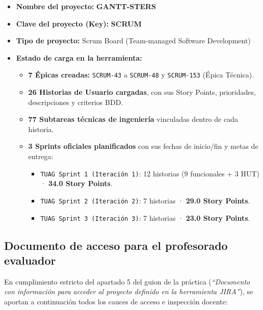 \documentclass[11pt,a4paper]{article}
\newcommand{\hl}[1]{\textcolor{gblue}{\textbf{#1}}}
\begin{document}
\begin{itemize}
\item \textbf{Nombre del proyecto:} \hl{GANTT-STERS}
\item \textbf{Clave del proyecto (Key):} \hl{SCRUM}
\item \textbf{Tipo de proyecto:} Scrum Board (Team-managed Software Development)
\item \textbf{Estado de carga en la herramienta:}
\begin{itemize}
\item \textbf{7 Épicas creadas:} \texttt{SCRUM-43} a \texttt{SCRUM-48} y \texttt{SCRUM-153} (Épica Técnica).
\item \textbf{26 Historias de Usuario cargadas}, con sus Story Points, prioridades, descripciones y criterios BDD.
\item \textbf{77 Subtareas técnicas de ingeniería} vinculadas dentro de cada historia.
\item \textbf{3 Sprints oficiales planificados} con sus fechas de inicio/fin y metas de entrega:
\begin{itemize}
\item \texttt{TUAG Sprint 1 (Iteración 1)}: 12 historias (9 funcionales + 3 HUT) · \textbf{34.0 Story Points}.
\item \texttt{TUAG Sprint 2 (Iteración 2)}: 7 historias · \textbf{29.0 Story Points}.
\item \texttt{TUAG Sprint 3 (Iteración 3)}: 7 historias · \textbf{23.0 Story Points}.
\end{itemize}
\end{itemize}
\end{itemize}

\subsection{Documento de acceso para el profesorado evaluador}
En cumplimiento estricto del apartado 5 del guion de la práctica (\textit{``Documento con información para acceder al proyecto definido en la herramienta JIRA''}), se aportan a continuación todos los cauces de acceso e inspección docente:
\end{document}
